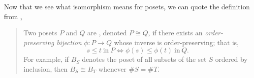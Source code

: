 Now that we see what isomorphism means for posets, we can quote the definition from \cite{Stanley:2011:ECV:2124415}, 

\begin{quotation}

Two posets $P$ and $Q$ are , denoted $P \cong Q$, if there exists an \emph{order-preserving bijection} $\phi : P \to Q$ whose inverse is order-preserving; that is, $$s \leq t~\text{in}~P \iff \phi(s) \leq \phi(t)~\text{in}~Q.$$ For example, if $B_S$ denotes the poset of all subsets of the set $S$ ordered by inclusion, then $B_S \cong B_T$ whenever $\#S = \#T$.

\end{quotation}
